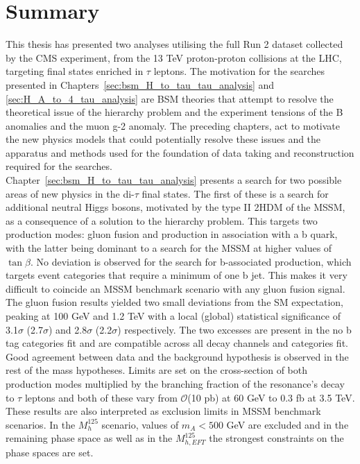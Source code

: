 \section{Summary}

This thesis has presented two analyses utilising the full Run 2 dataset collected by the \ac{CMS} experiment, from the 13 TeV proton-proton collisions at the \ac{LHC}, targeting final states enriched in $\tau$ leptons.
The motivation for the searches presented in Chapters~\ref{sec:bsm_H_to_tau_tau_analysis} and \ref{sec:H_A_to_4_tau_analysis} are \ac{BSM} theories that attempt to resolve the theoretical issue of the hierarchy problem and the experiment tensions of the B anomalies and the muon g-2 anomaly.
The preceding chapters, act to motivate the new physics models that could potentially resolve these issues and the apparatus and methods used for the foundation of data taking and reconstruction required for the searches. \\

Chapter~\ref{sec:bsm_H_to_tau_tau_analysis} presents a search for two possible areas of new physics in the di-$\tau$ final states.
The first of these is a search for additional neutral Higgs bosons, motivated by the type II \ac{2HDM} of the \ac{MSSM}, as a consequence of a solution to the hierarchy problem.
This targets two production modes: gluon fusion and production in association with a b quark, with the latter being dominant to a search for the \ac{MSSM} at higher values of $\tan\beta$.
No deviation is observed for the search for b-associated production, which targets event categories that require a minimum of one b jet.
This makes it very difficult to coincide an \ac{MSSM} benchmark scenario with any gluon fusion signal.
The gluon fusion results yielded two small deviations from the \ac{SM} expectation, peaking at 100 GeV and 1.2 TeV with a local (global) statistical significance of 3.1$\sigma$ (2.7$\sigma$) and 2.8$\sigma$ (2.2$\sigma$) respectively.
The two excesses are present in the no b tag categories fit and are compatible across all decay channels and categories fit.
Good agreement between data and the background hypothesis is observed in the rest of the mass hypotheses.
Limits are set on the cross-section of both production modes multiplied by the branching fraction of the resonance's decay to $\tau$ leptons and both of these vary from $\mathcal{O}$(10 pb) at 60 GeV to 0.3 fb at 3.5 TeV.
These results are also interpreted as exclusion limits in \ac{MSSM} benchmark scenarios.
In the $M_{h}^{125}$ scenario, values of $m_A < 500$ GeV are excluded and in the remaining phase space as well as in the $M_{h, EFT}^{125}$ the strongest constraints on the phase spaces are set. \\

